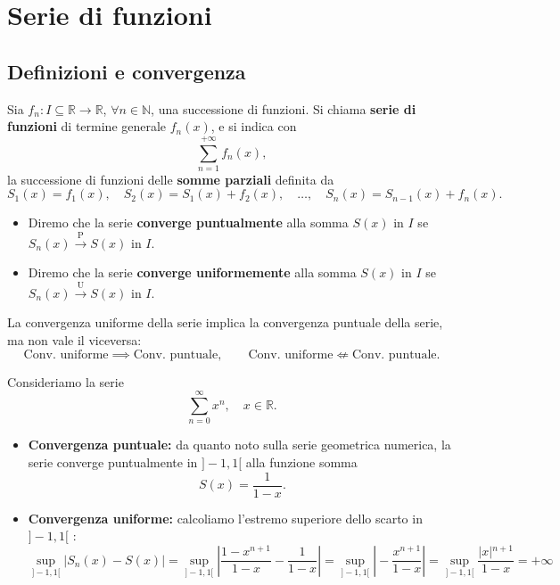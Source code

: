 
\section{Serie di funzioni}

\subsection{Definizioni e convergenza}

\begin{definition}
Sia $f_n : I \subseteq \mathbb{R} \to \mathbb{R}$, $\forall n \in \mathbb{N}$, una successione di funzioni. Si chiama \textbf{serie di funzioni} di termine generale $f_n(x)$, e si indica con
$$\sum_{n=1}^{+\infty} f_n(x),$$
la successione di funzioni delle \textbf{somme parziali} definita da
$$S_1(x) = f_1(x), \quad S_2(x) = S_1(x) + f_2(x), \quad \dots, \quad S_n(x) = S_{n-1}(x) + f_n(x).$$
\begin{itemize}
\item Diremo che la serie \textbf{converge puntualmente} alla somma $S(x)$ in $I$ se $S_n(x) \xrightarrow{\text{P}} S(x)$ in $I$.
\item Diremo che la serie \textbf{converge uniformemente} alla somma $S(x)$ in $I$ se $S_n(x) \xrightarrow{\text{U}} S(x)$ in $I$.
\end{itemize}
\end{definition}\begin{oss}
La convergenza uniforme della serie implica la convergenza puntuale della serie, ma non vale il viceversa:
$$\text{Conv. uniforme} \implies \text{Conv. puntuale}, \qquad \text{Conv. uniforme} \not\Longleftarrow \text{Conv. puntuale}.$$
\end{oss}\begin{example}
Consideriamo la serie
$$\sum_{n=0}^{\infty} x^n, \quad x \in \mathbb{R}.$$
\begin{itemize}
\item \textbf{Convergenza puntuale:} da quanto noto sulla serie geometrica numerica, la serie converge puntualmente in $]-1, 1[$ alla funzione somma
$$S(x) = \frac{1}{1 - x}.$$
\item \textbf{Convergenza uniforme:} calcoliamo l'estremo superiore dello scarto in $]-1, 1[$ :
$$\sup_{]-1, 1[} \vert{}S_n(x) - S(x)\vert{} = \sup_{]-1, 1[} \left\vert{} \frac{1 - x^{n+1}}{1 - x} - \frac{1}{1 - x} \right\vert{} = \sup_{]-1, 1[} \left\vert{} -\frac{x^{n+1}}{1 - x} \right\vert{} = \sup_{]-1, 1[} \frac{\vert{}x\vert{}^{n+1}}{1 - x} = +\infty$$

\end{itemize}
\end{example}
